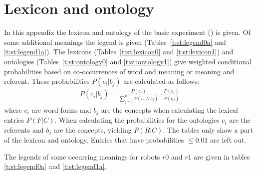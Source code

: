 \chapter{Lexicon and ontology}\label{a:lexicon}

In this appendix the lexicon and ontology of the basic experiment () is given. Of some additional meanings the legend is given (Tables~\ref{t:st:legend0a} and \ref{t:st:legend1a}). The lexicons (Tables~\ref{t:st:lexicon0} and \ref{t:st:lexicon1}) and ontologies (Tables~\ref{t:st:ontology0} and \ref{t:st:ontology1}) give  weighted conditional probabilities based on co-occurrences of word and meaning or meaning and referent. These probabilities $P(c_i|b_j)$ are calculated as follows:
\begin{eqnarray}
P(c_i|b_j) = \frac{P(c_i)}{\sum_{j=1}^n P(c_i \wedge b_j)} \cdot \frac{P(c_i)}{P(b_j)}
\end{eqnarray}
where $c_i$ are word-forms and $b_j$ are the concepts when calculating the lexical entries $P(F|C)$. When calculating the probabilities for the ontologies $c_i$ are the referents and $b_j$ are the concepts, yielding $P(R|C)$. The tables only show a part of the lexicon and ontology. Entries that have probabilities $\leq 0.01$ are left out.

The legends of some occurring meanings for robots $r0$ and $r1$ are given in tables \ref{t:st:legend0a} and \ref{t:st:legend1a}.

